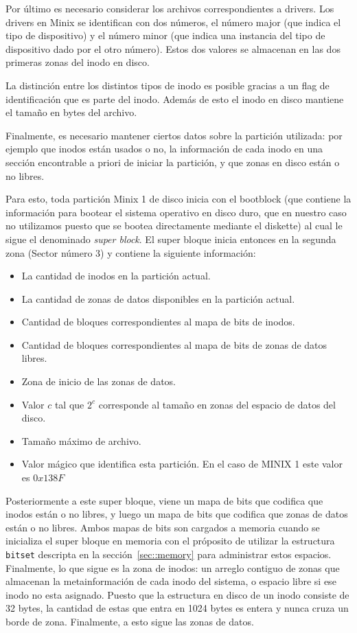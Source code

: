 Por \'ultimo es necesario considerar los archivos correspondientes a drivers. Los drivers en Minix se identifican con dos n\'umeros, el
n\'umero major (que indica el tipo de dispositivo) y el n\'umero minor (que indica una instancia del tipo de dispositivo dado por el otro
n\'umero). Estos dos valores se almacenan en las dos primeras zonas del inodo en disco.

La distinci\'on entre los distintos tipos de inodo es posible gracias a un flag de identificaci\'on que es parte del inodo. Adem\'as de esto
el inodo en disco mantiene el tama\~no en bytes del archivo.

Finalmente, es necesario mantener ciertos datos sobre la partici\'on utilizada: por ejemplo que inodos est\'an usados o no, la informaci\'on
de cada inodo en una secci\'on encontrable a priori de iniciar la partici\'on, y que zonas en disco est\'an o no libres.

Para esto, toda partici\'on Minix 1 de disco inicia con el bootblock (que contiene la informaci\'on para bootear el sistema operativo en disco
duro, que en nuestro caso no utilizamos puesto que se bootea directamente mediante el diskette) al cual le sigue el denominado \textit{super block}. El super bloque inicia entonces en la segunda zona (Sector n\'umero 3) y contiene la siguiente informaci\'on:

\begin{itemize}
	\item La cantidad de inodos en la partici\'on actual.
	\item La cantidad de zonas de datos disponibles en la partici\'on actual.
	\item Cantidad de bloques correspondientes al mapa de bits de inodos.
	\item Cantidad de bloques correspondientes al mapa de bits de zonas de datos libres.
	\item Zona de inicio de las zonas de datos.
	\item Valor $c$ tal que $2^c$ corresponde al tama\~no en zonas del espacio de datos del disco.
	\item Tama\~no m\'aximo de archivo.
	\item Valor m\'agico que identifica esta partici\'on. En el caso de MINIX 1 este valor es $0x138F$
\end{itemize}

Posteriormente a este super bloque, viene un mapa de bits que codifica que inodos est\'an o no libres, y luego un mapa de bits que codifica
que zonas de datos est\'an o no libres. Ambos mapas de bits son cargados a memoria cuando se inicializa el super bloque en memoria con el
pr\'oposito de utilizar la estructura \texttt{bitset} descripta en la secci\'on~\ref{sec::memory} para administrar estos espacios. Finalmente,
lo que sigue es la zona de inodos: un arreglo contiguo de zonas que almacenan la metainformaci\'on de cada inodo del sistema, o espacio libre
si ese inodo no esta asignado. Puesto que la estructura en disco de un inodo consiste de 32 bytes, la cantidad de estas que entra en 1024 bytes
es entera y nunca cruza un borde de zona. Finalmente, a esto sigue las zonas de datos.

